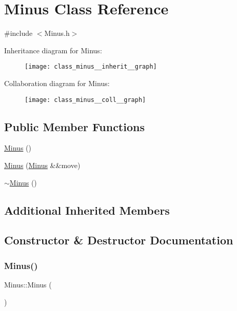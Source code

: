 \hypertarget{class_minus}{}\section{Minus Class Reference}
\label{class_minus}


{\ttfamily \#include $<$Minus.\+h$>$}



Inheritance diagram for Minus\+:
\nopagebreak
\begin{figure}[H]
\begin{center}
\leavevmode
\texttt{[image: class\_minus\_\_inherit\_\_graph]}
\end{center}
\end{figure}


Collaboration diagram for Minus\+:
\nopagebreak
\begin{figure}[H]
\begin{center}
\leavevmode
\texttt{[image: class\_minus\_\_coll\_\_graph]}
\end{center}
\end{figure}
\subsection*{Public Member Functions}
\begin{DoxyCompactItemize}
\item 
\mbox{\hyperlink{class_minus_a0ab0dc9a4eb60abb59521253a5e392aa}{Minus}} ()
\item 
\mbox{\hyperlink{class_minus_a2fb3ccb1913a42c49a2a59216975c264}{Minus}} (\mbox{\hyperlink{class_minus}{Minus}} \&\&move)
\item 
\mbox{\hyperlink{class_minus_aaedbd18eff14944142f4800c07492020}{$\sim$\+Minus}} ()
\end{DoxyCompactItemize}
\subsection*{Additional Inherited Members}


\subsection{Constructor \& Destructor Documentation}
\mbox{\label{class_minus_a0ab0dc9a4eb60abb59521253a5e392aa}} 
\subsubsection{\texorpdfstring{Minus()}{Minus()}\hspace{0.1cm}{\footnotesize\ttfamily [1/2]}}
{\footnotesize\ttfamily Minus\+::\+Minus (\begin{DoxyParamCaption}{ }\end{DoxyParamCaption})}

